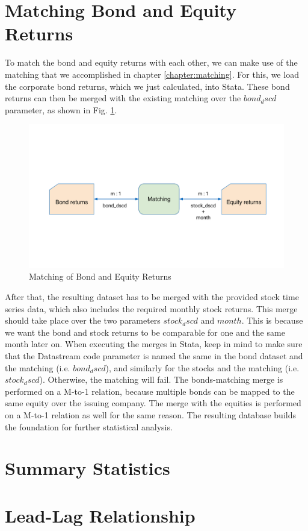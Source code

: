 \section{Matching Bond and Equity Returns}
To match the bond and equity returns with each other, we can make use of the matching that we accomplished in chapter \ref{chapter:matching}. For this, we load the corporate bond returns, which we just calculated, into Stata. These bond returns can then be merged with the existing matching over the $bond_dscd$ parameter, as shown in Fig. \ref{fig:matching-returns}. 
\begin{figure}[h]
	\centering
	\includegraphics[trim={0 4.5cm 0 5cm},clip,width=1.0\linewidth]{figures/matching-returns.pdf}
	\caption{Matching of Bond and Equity Returns}
	\label{fig:matching-returns}
\end{figure}
After that, the resulting dataset has to be merged with the provided stock time series data, which also includes the required monthly stock returns. This merge should take place over the two parameters $stock_dscd$ and $month$. This is because we want the bond and stock returns to be comparable for one and the same month later on. When executing the merges in Stata, keep in mind to make sure that the Datastream code parameter is named the same in the bond dataset and the matching (i.e. $bond_dscd$), and similarly for the stocks and the matching (i.e. $stock_dscd$). Otherwise, the matching will fail. The bonds-matching merge is performed on a M-to-1 relation, because multiple bonds can be mapped to the same equity over the issuing company. The merge with the equities is performed on a M-to-1 relation as well for the same reason. The resulting database builds the foundation for further statistical analysis. 

\section{Summary Statistics} \label{section:summary-statistics}



\section{Lead-Lag Relationship} \label{section:lead-lag-relationship}











